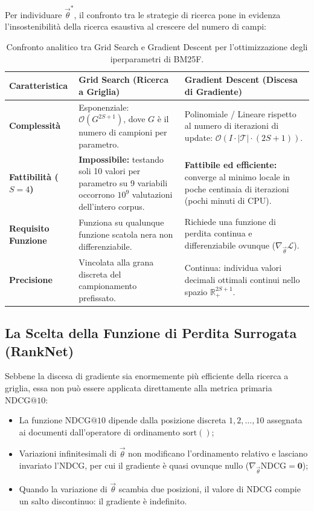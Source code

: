 Per individuare $\vec{\theta}^*$, il confronto tra le strategie di ricerca pone in evidenza l'insostenibilit\`a della ricerca esaustiva al crescere del numero di campi:

\begin{table}[H]
\centering
\small
\begin{tabularx}{\linewidth}{l X X}
\toprule
\textbf{Caratteristica} & \textbf{Grid Search (Ricerca a Griglia)} & \textbf{Gradient Descent (Discesa di Gradiente)} \\
\midrule
\textbf{Complessit\`a} & Esponenziale: $\mathcal{O}(G^{2S+1})$, dove $G$ \`e il numero di campioni per parametro. & Polinomiale / Lineare rispetto al numero di iterazioni di update: $\mathcal{O}(I \cdot |\mathcal{T}| \cdot (2S+1))$. \\
\addlinespace
\textbf{Fattibilit\`a ($S=4$)} & \textbf{Impossibile:} testando soli 10 valori per parametro su 9 variabili occorrono $10^9$ valutazioni dell'intero corpus. & \textbf{Fattibile ed efficiente:} converge al minimo locale in poche centinaia di iterazioni (pochi minuti di CPU). \\
\addlinespace
\textbf{Requisito Funzione} & Funziona su qualunque funzione scatola nera non differenziabile. & Richiede una funzione di perdita continua e differenziabile ovunque ($\nabla_{\vec{\theta}} \mathcal{L}$). \\
\addlinespace
\textbf{Precisione} & Vincolata alla grana discreta del campionamento prefissato. & Continua: individua valori decimali ottimali continui nello spazio $\mathbb{R}_+^{2S+1}$. \\
\bottomrule
\end{tabularx}
\caption{Confronto analitico tra Grid Search e Gradient Descent per l'ottimizzazione degli iperparametri di BM25F.}
\label{tab:grid-search-vs-gradient-descent}
\end{table}

\FloatBarrier
\subsection{La Scelta della Funzione di Perdita Surrogata (RankNet)}
\label{subsec:scelta-funzione-perdita-surrogata}

Sebbene la discesa di gradiente sia enormemente pi\`u efficiente della ricerca a griglia, essa non pu\`o essere applicata direttamente alla metrica primaria $\text{NDCG@10}$:
\begin{itemize}
    \item La funzione $\text{NDCG@10}$ dipende dalla posizione discreta $1, 2, \dots, 10$ assegnata ai documenti dall'operatore di ordinamento $\text{sort}()$;
    \item Variazioni infinitesimali di $\vec{\theta}$ non modificano l'ordinamento relativo e lasciano invariato l'NDCG, per cui il gradiente \`e quasi ovunque nullo ($\nabla_{\vec{\theta}} \text{NDCG} = \mathbf{0}$);
    \item Quando la variazione di $\vec{\theta}$ scambia due posizioni, il valore di NDCG compie un salto discontinuo: il gradiente \`e indefinito.
\end{itemize}

